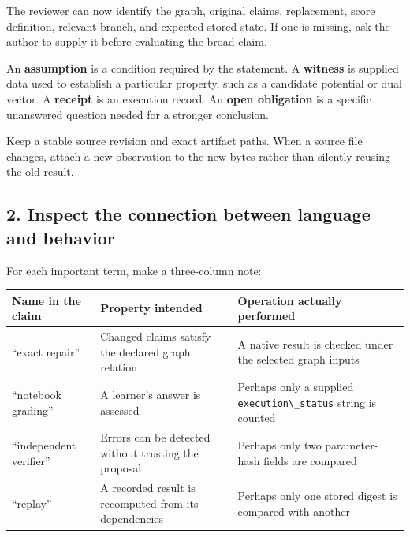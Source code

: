 \documentclass[
  11pt,
]{article}
\newcommand{\passthrough}[1]{#1}
\begin{document}
The reviewer can now identify the graph, original claims, replacement,
score definition, relevant branch, and expected stored state. If one is
missing, ask the author to supply it before evaluating the broad claim.

An \textbf{assumption} is a condition required by the statement. A
\textbf{witness} is supplied data used to establish a particular
property, such as a candidate potential or dual vector. A
\textbf{receipt} is an execution record. An \textbf{open obligation} is
a specific unanswered question needed for a stronger conclusion.

Keep a stable source revision and exact artifact paths. When a source
file changes, attach a new observation to the new bytes rather than
silently reusing the old result.

\subsection{2. Inspect the connection between language and
behavior}\label{inspect-the-connection-between-language-and-behavior}

For each important term, make a three-column note:

\begin{longtable}[]{@{}
  >{\raggedright\arraybackslash}p{}
  >{\raggedright\arraybackslash}p{}
  >{\raggedright\arraybackslash}p{}@{}}
\toprule\noalign{}
\begin{minipage}[b]{\linewidth}\raggedright
Name in the claim
\end{minipage} & \begin{minipage}[b]{\linewidth}\raggedright
Property intended
\end{minipage} & \begin{minipage}[b]{\linewidth}\raggedright
Operation actually performed
\end{minipage} \\
\midrule\noalign{}
\endhead
\bottomrule\noalign{}
\endlastfoot
``exact repair'' & Changed claims satisfy the declared graph relation &
A native result is checked under the selected graph inputs \\
``notebook grading'' & A learner's answer is assessed & Perhaps only a
supplied \passthrough{\lstinline!execution\_status!} string is
counted \\
``independent verifier'' & Errors can be detected without trusting the
proposal & Perhaps only two parameter-hash fields are compared \\
``replay'' & A recorded result is recomputed from its dependencies &
Perhaps only one stored digest is compared with another \\
\end{longtable}
\end{document}
